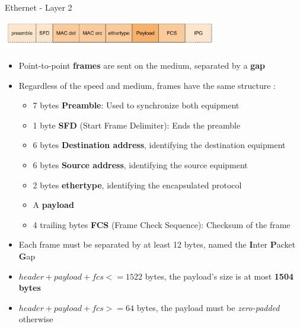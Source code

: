 \begin{frame}{Ethernet - Layer 2}
	\begin{center}
	\includegraphics[width=0.7\textwidth]{slides/networking-stack-overview/ethernet_frame.pdf}
	\end{center}
	\begin{itemize}
		\item Point-to-point \textbf{frames} are sent on the medium, separated by a \textbf{gap}
		\item Regardless of the speed and medium, frames have the same structure :
			\begin{itemize}
				\item 7 bytes \textbf{Preamble}: Used to synchronize both equipment
				\item 1 byte \textbf{SFD} (Start Frame Delimiter): Ends the preamble
				\item 6 bytes \textbf{Destination address}, identifying the destination equipment
				\item 6 bytes \textbf{Source address}, identifying the source equipment
				\item 2 bytes \textbf{ethertype}, identifying the encapsulated protocol
				\item A \textbf{payload}
				\item 4 trailing bytes \textbf{FCS} (Frame Check Sequence): Checksum of the frame
			\end{itemize}
		\item Each frame must be separated by at least 12 bytes, named the \textbf{I}nter \textbf{P}acket \textbf{G}ap
		\item $header + payload + fcs <= 1522$ bytes, the payload's size is at most \textbf{1504 bytes}
		\item $header + payload + fcs >= 64$ bytes, the payload must be \textit{zero-padded} otherwise
	\end{itemize}
\end{frame}

